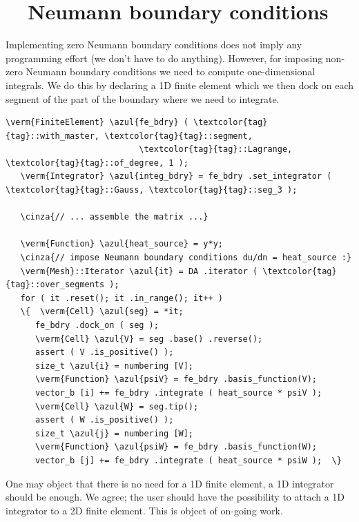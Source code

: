 \section{~~Neumann boundary conditions}\label{\numb section 6.\numb parag 3}

Implementing zero Neumann boundary conditions does not imply any programming effort
(we don't have to do anything).
However, for imposing non-zero Neumann boundary conditions we need to compute one-dimensional
integrals.
We do this by declaring a 1D finite element which we then dock on each segment of the
part of the boundary where we need to integrate.

\begin{Verbatim}[commandchars=\\\{\},formatcom=\small\tt,frame=single,
   label=parag-\ref{\numb section 6.\numb parag 3}.cpp,rulecolor=\color{moldura},
   baselinestretch=0.94,framesep=2mm                                            ]
   \verm{FiniteElement} \azul{fe_bdry} ( \textcolor{tag}{tag}::with_master, \textcolor{tag}{tag}::segment,
                           \textcolor{tag}{tag}::Lagrange, \textcolor{tag}{tag}::of_degree, 1 );
   \verm{Integrator} \azul{integ_bdry} = fe_bdry .set_integrator ( \textcolor{tag}{tag}::Gauss, \textcolor{tag}{tag}::seg_3 );

   \cinza{// ... assemble the matrix ...}

   \verm{Function} \azul{heat_source} = y*y;
   \cinza{// impose Neumann boundary conditions du/dn = heat_source :}
   \verm{Mesh}::Iterator \azul{it} = DA .iterator ( \textcolor{tag}{tag}::over_segments );
   for ( it .reset(); it .in_range(); it++ )
   \{  \verm{Cell} \azul{seg} = *it;
      fe_bdry .dock_on ( seg );
      \verm{Cell} \azul{V} = seg .base() .reverse();
      assert ( V .is_positive() );
      size_t \azul{i} = numbering [V];
      \verm{Function} \azul{psiV} = fe_bdry .basis_function(V);
      vector_b [i] += fe_bdry .integrate ( heat_source * psiV );
      \verm{Cell} \azul{W} = seg.tip();
      assert ( W .is_positive() );
      size_t \azul{j} = numbering [W];
      \verm{Function} \azul{psiW} = fe_bdry .basis_function(W);
      vector_b [j] += fe_bdry .integrate ( heat_source * psiW );  \}
\end{Verbatim}

One may object that there is no need for a 1D finite element, a 1D integrator should be enough.
We agree; the user should have the possibility to attach a 1D integrator to a 2D finite element.
This is object of on-going work.

